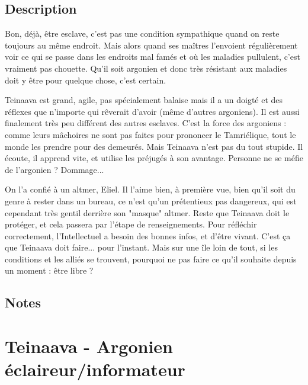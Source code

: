 \documentclass{Tamriel}
\begin{document}
\begin{multicols*}{2}
\raggedcolumns

        \section*{Description}

        Bon, déjà, être esclave, c'est pas une condition sympathique quand on reste toujours au même endroit. Mais alors quand ses maîtres l'envoient régulièrement voir ce qui se passe dans les endroits mal famés et où les maladies pullulent, c'est vraiment pas chouette. Qu'il soit argonien et donc très résistant aux maladies doit y être pour quelque chose, c'est certain.
        
        Teinaava est grand, agile, pas spécialement balaise mais il a un doigté et des réflexes que n'importe qui rêverait d'avoir (même d'autres argoniens). Il est aussi finalement très peu différent des autres esclaves. C'est la force des argoniens : comme leurs mâchoires ne sont pas faites pour prononcer le Tamriélique, tout le monde les prendre pour des demeurés. Mais Teinaava n'est pas du tout stupide. Il écoute, il apprend vite, et utilise les préjugés à son avantage. Personne ne se méfie de l'argonien ? Dommage...
        
        On l'a confié à un altmer, Eliel. Il l'aime bien, à première vue, bien qu'il soit du genre à rester dans un bureau, ce n'est qu'un prétentieux pas dangereux, qui est cependant très gentil derrière son "masque" altmer. Reste que Teinaava doit le protéger, et cela passera par l'étape de renseignements. Pour réfléchir correctement, l'Intellectuel a besoin des bonnes infos, et d'être vivant. C'est ça que Teinaava doit faire... pour l'instant. Mais sur une île loin de tout, si les conditions et les alliés se trouvent, pourquoi ne pas faire ce qu'il souhaite depuis un moment : être libre ?
        
        \columnbreak

        \section*{Notes}
        
\end{multicols*}

\chapter*{Teinaava - Argonien éclaireur/informateur}
\end{document}
